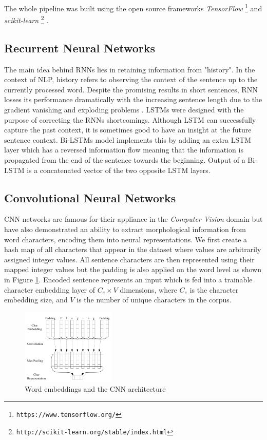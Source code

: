 \documentclass[10pt, a4paper]{article}
\begin{document}
The whole pipeline was built using the open source frameworks
\emph{TensorFlow} \footnote{\texttt{https://www.tensorflow.org/}} \citep{tensorflow2015}
and
\emph{scikit-learn} \footnote{\texttt{http://scikit-learn.org/stable/index.html}} \citep{scikit-learn}.

\subsection{Recurrent Neural Networks}

The main idea behind RNNs lies in retaining information from "history". In the 
context of NLP, history refers to observing the context of the sentence up to the
currently processed word. Despite the promising results in short sentences, RNN
losses its performance dramatically with the increasing sentence length due to 
the gradient vanishing \citep{bengio1994learning} and exploding problems 
\citep{pascanu2013difficulty}. LSTMs were designed with the purpose of correcting 
the RNNs shortcomings. Although LSTM can successfully capture the past context,
it is sometimes good to have an insight at the future sentence context. Bi-LSTMs 
model implements this by adding an extra LSTM layer which has a reversed information flow
meaning that the information is propagated from the end of the sentence towards
the beginning. Output of a Bi-LSTM is a concatenated vector of the two opposite LSTM layers.

\subsection{Convolutional Neural Networks}
CNN networks are famous for their appliance in the \emph{Computer Vision}
domain but have also demonstrated an ability to extract morphological information
from word characters, encoding them into neural representations. We first create
a hash map of all characters that appear in the dataset where values are arbitrarily
assigned integer values. All sentence characters are then represented using their
mapped integer values but the padding is also applied on the word level as shown
in Figure \ref{fig:cnn_embed}. Encoded sentence represents an input which is fed
into a trainable character embedding layer of $C_e \times V$ dimensions, where
$C_e$ is the character embedding size, and $V$ is the number of unique
characters in the corpus.

\begin{figure}
  \caption{Word embeddings and the CNN architecture}
  \label{fig:cnn_embed}
  \centering
    \includegraphics[width=0.4\textwidth]{imgs/cnn_embed.png}
\end{figure}
\end{document}
